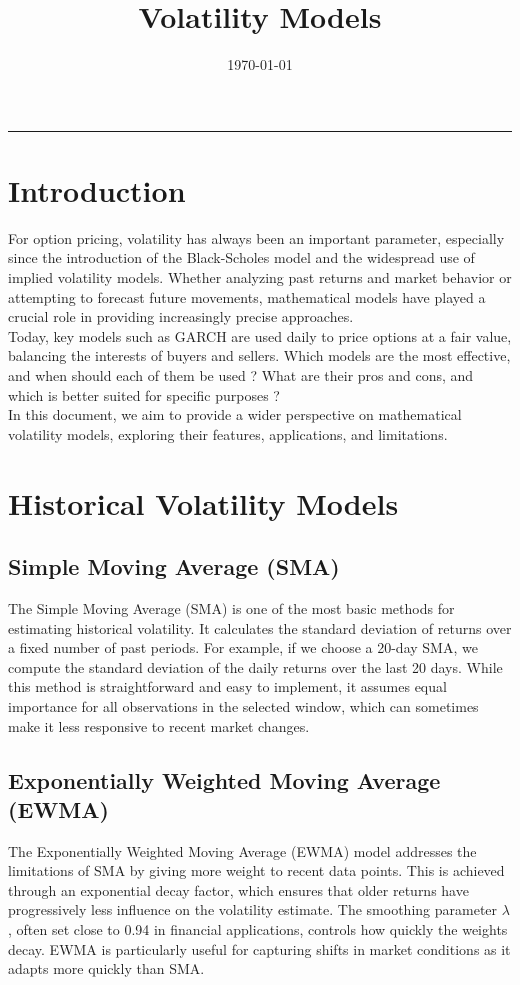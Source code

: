 \documentclass[letterpaper,11pt]{article}
\title{\vspace{-2.5em}\textbf{Volatility Models}}
\author{}
\date{\today}
\begin{document}
\maketitle
\vspace{-1em}
\hrule
\tableofcontents


\vfill
\section{Introduction}
For option pricing, volatility has always been an important parameter, especially since the introduction of the Black-Scholes model and the widespread use of implied volatility models. Whether analyzing past returns and market behavior or attempting to forecast future movements, mathematical models have played a crucial role in providing increasingly precise approaches.\\

Today, key models such as GARCH are used daily to price options at a fair value, balancing the interests of buyers and sellers. Which models are the most effective, and when should each of them be used ? What are their pros and cons, and which is better suited for specific purposes ?\\

In this document, we aim to provide a wider perspective on mathematical volatility models, exploring their features, applications, and limitations.



\section{Historical Volatility Models}

\subsection{Simple Moving Average (SMA)}
The Simple Moving Average (SMA) is one of the most basic methods for estimating historical volatility. It calculates the standard deviation of returns over a fixed number of past periods. For example, if we choose a 20-day SMA, we compute the standard deviation of the daily returns over the last 20 days. While this method is straightforward and easy to implement, it assumes equal importance for all observations in the selected window, which can sometimes make it less responsive to recent market changes.

\subsection{Exponentially Weighted Moving Average (EWMA)}
The Exponentially Weighted Moving Average (EWMA) model addresses the limitations of SMA by giving more weight to recent data points. This is achieved through an exponential decay factor, which ensures that older returns have progressively less influence on the volatility estimate. The smoothing parameter \( \lambda \), often set close to 0.94 in financial applications, controls how quickly the weights decay. EWMA is particularly useful for capturing shifts in market conditions as it adapts more quickly than SMA.
\end{document}
